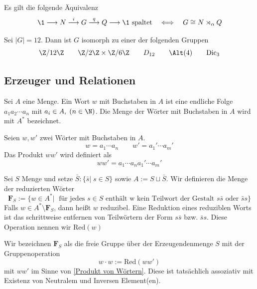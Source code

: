 \documentclass[11pt, a4paper]{article}
\begin{document}
\begin{theorem}
Es gilt die folgende Äquivalenz
$$\1 \longrightarrow N \overset{i}{\longrightarrow} G \overset{q}{\longrightarrow} Q\longrightarrow \1  \text{ spaltet} \quad\Longleftrightarrow\quad  G \cong N\rtimes_\alpha Q$$
    
\end{theorem}

\begin{theorem} Sei $|G|=12$. Dann ist $G$ isomorph zu einer der folgenden Gruppen
$$\Z/12\Z\qquad \Z/2\Z \times \Z/6\Z \qquad D_{12} \qquad \Alt(4) \qquad \mathrm{Dic}_3$$
    
\end{theorem}
\subsection{Erzeuger und Relationen}

\begin{definition}
Sei $A$ eine Menge. Ein Wort $w$ mit Buchstaben in $A$ ist eine endliche Folge $a_1a_2\cdots a_n$ mit $a_i\in A, \; (n\in \N)$. Die Menge der Wörter mit Buchstaben in $A$ wird mit $A^* $ bezeichnet.
\end{definition}

\begin{definition} \label{Produkt von Wörtern}Seien $w,w'$ zwei Wörter mit Buchstaben in $A$. 
$$w=a_1 \cdots a_n \qquad w' = a_1'\cdots a_m'$$
Das Produkt $ww'$ wird definiert als
$$ww'=a_1 \cdots a_n a_1'\cdots a_m'$$
\end{definition}

\begin{definition} Sei $S$ Menge und setze $\bar S:\{\bar s| \; s\in S\}$ sowie $A:=S\sqcup \bar S$. Wir definieren die Menge der reduzierten Wörter 
$$\mathbf{F}_S := \{w\in A^*| \; \text{ für jedes $s\in S$ enthält w kein Teilwort der Gestalt $s\bar s$ oder $\bar s s$}\} $$
Falls $w\in A^* \setminus \mathbf F _S$, dann heißt $w$ reduzibel. Eine Reduktion eines reduziblen Worts ist das schrittweise entfernen von Teilwörtern der Form $s\bar s$ bzw. $\bar s s $. Diese Operation nennen wir $\mathrm{Red}(w)$
\end{definition}
\begin{definition} Wir bezeichnen $\mathbf{F}_S$ als die freie Gruppe über der Erzeugendenmenge $S$ mit der Gruppenoperation
$$w\cdot w:= \mathrm{Red}(ww')$$
mit $ww'$ im Sinne von \ref{Produkt von Wörtern}. Diese ist tatsächlich assoziativ mit Existenz von Neutralem und Inversen Element(en).
    
\end{definition}
\end{document}
